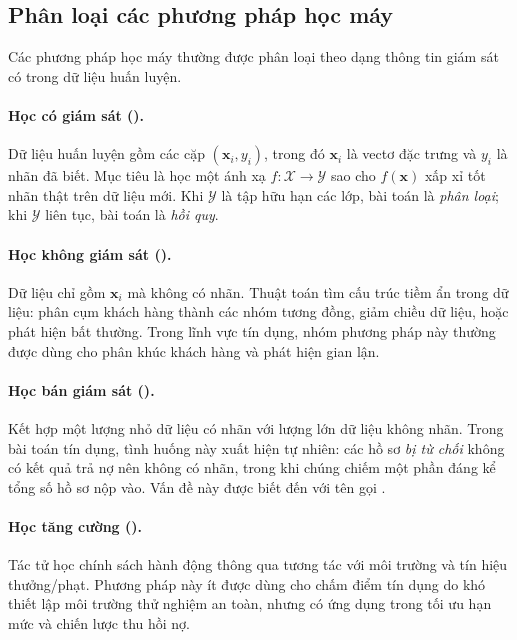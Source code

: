 \subsection{Phân loại các phương pháp học máy}
\label{subsec:phan-loai-hoc-may}

Các phương pháp học máy thường được phân loại theo dạng thông tin giám sát có
trong dữ liệu huấn luyện.

\paragraph{Học có giám sát ().} Dữ liệu huấn luyện gồm
các cặp $(\bm{x}_i, y_i)$, trong đó $\bm{x}_i$ là vectơ đặc trưng và $y_i$ là
nhãn đã biết. Mục tiêu là học một ánh xạ $f: \mathcal{X} \to \mathcal{Y}$ sao cho
$f(\bm{x})$ xấp xỉ tốt nhãn thật trên dữ liệu mới. Khi $\mathcal{Y}$ là tập hữu
hạn các lớp, bài toán là \textit{phân loại}; khi $\mathcal{Y}$ liên tục, bài toán
là \textit{hồi quy}.

\paragraph{Học không giám sát ().} Dữ liệu chỉ gồm
$\bm{x}_i$ mà không có nhãn. Thuật toán tìm cấu trúc tiềm ẩn trong dữ liệu: phân
cụm khách hàng thành các nhóm tương đồng, giảm chiều dữ liệu, hoặc phát hiện bất
thường. Trong lĩnh vực tín dụng, nhóm phương pháp này thường được dùng cho phân
khúc khách hàng và phát hiện gian lận.

\paragraph{Học bán giám sát ().} Kết hợp một lượng
nhỏ dữ liệu có nhãn với lượng lớn dữ liệu không nhãn. Trong bài toán tín dụng,
tình huống này xuất hiện tự nhiên: các hồ sơ \textit{bị từ chối} không có kết quả
trả nợ nên không có nhãn, trong khi chúng chiếm một phần đáng kể tổng số hồ sơ
nộp vào. Vấn đề này được biết đến với tên gọi .

\paragraph{Học tăng cường ().} Tác tử học chính sách
hành động thông qua tương tác với môi trường và tín hiệu thưởng/phạt. Phương pháp
này ít được dùng cho chấm điểm tín dụng do khó thiết lập môi trường thử nghiệm an
toàn, nhưng có ứng dụng trong tối ưu hạn mức và chiến lược thu hồi nợ.

